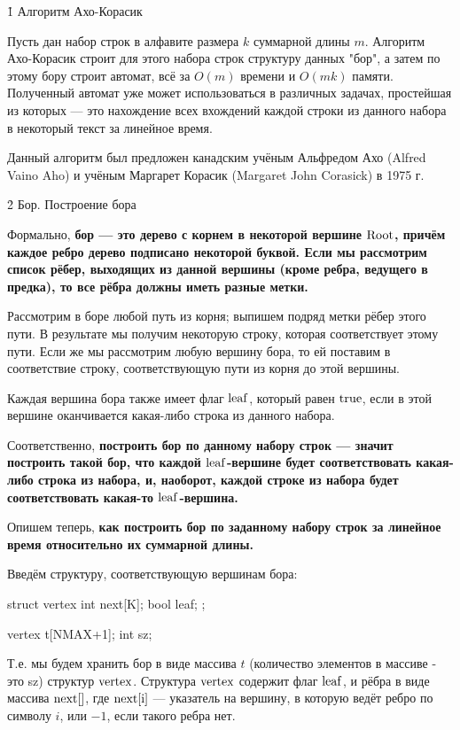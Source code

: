 \h1{ Алгоритм Ахо-Корасик }

Пусть дан набор строк в алфавите размера $k$ суммарной длины $m$. Алгоритм Ахо-Корасик строит для этого набора строк структуру данных "бор", а затем по этому бору строит автомат, всё за $O (m)$ времени и $O (m k)$ памяти. Полученный автомат уже может использоваться в различных задачах, простейшая из которых --- это нахождение всех вхождений каждой строки из данного набора в некоторый текст за линейное время.

Данный алгоритм был предложен канадским учёным Альфредом Ахо (Alfred Vaino Aho) и учёным Маргарет Корасик (Margaret John Corasick) в 1975 г.


\h2{ Бор. Построение бора }

Формально, \bf{бор} --- это дерево с корнем в некоторой вершине $\rm Root$, причём каждое ребро дерево подписано некоторой буквой. Если мы рассмотрим список рёбер, выходящих из данной вершины (кроме ребра, ведущего в предка), то все рёбра должны иметь разные метки.

Рассмотрим в боре любой путь из корня; выпишем подряд метки рёбер этого пути. В результате мы получим некоторую строку, которая соответствует этому пути. Если же мы рассмотрим любую вершину бора, то ей поставим в соответствие строку, соответствующую пути из корня до этой вершины.

Каждая вершина бора также имеет флаг $\rm leaf$, который равен $\rm true$, если в этой вершине оканчивается какая-либо строка из данного набора.

Соответственно, \bf{построить бор} по данному набору строк --- значит построить такой бор, что каждой $\rm leaf$-вершине будет соответствовать какая-либо строка из набора, и, наоборот, каждой строке из набора будет соответствовать какая-то $\rm leaf$-вершина.

Опишем теперь, \bf{как построить бор} по заданному набору строк за линейное время относительно их суммарной длины.

Введём структуру, соответствующую вершинам бора:

\code
struct vertex {
	int next[K];
	bool leaf;
};

vertex t[NMAX+1];
int sz;
\endcode

Т.е. мы будем хранить бор в виде массива $t$ (количество элементов в массиве - это sz) структур $\rm vertex$. Структура $\rm vertex$ содержит флаг $\rm leaf$, и рёбра в виде массива $\rm next[]$, где $\rm next[i]$ --- указатель на вершину, в которую ведёт ребро по символу $i$, или $-1$, если такого ребра нет.

